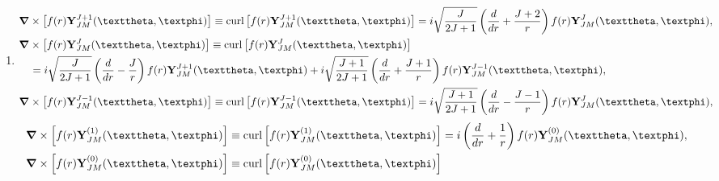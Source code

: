 \begin{enumerate}[label=(\alph*)]
\begin{align}
\end{align}
\begin{align}
\boldsymbol{\nabla} \cdot\left[f(r) \vect{Y}_{J M}^{(1)}(\vartheta, \varphi)\right] &\equiv \diver \left[f(r) \vect{Y}_{J M}^{(1)}(\vartheta, \varphi)\right]=-\sqrt{J(J+1)} \frac{1}{r} f(r) Y_{J M}(\vartheta, \varphi), \notag\\
\boldsymbol{\nabla} \cdot\left[f(r) \vect{Y}_{J M}^{(0)}(\vartheta, \varphi)\right] &\equiv \diver \left[f(r) \vect{Y}_{J M}^{(0)}(\vartheta, \varphi)\right]=0, \label{eq:7:3:54}\\
\boldsymbol{\nabla} \cdot\left[f(r) \vect{Y}_{J M}^{(-1)}(\vartheta, \varphi)\right] &\equiv \diver \left[f(r) \vect{Y}_{J M}^{(-1)}(\vartheta, \varphi)\right]=\left(\frac{d}{d r}+\frac{2}{r}\right) f(r) Y_{J M}(\vartheta, \varphi). \notag
\end{align}
\item 
\begin{align}
& \boldsymbol{\nabla} \times\left[f(r) \vect{Y}_{J M}^{J+1}(\vartheta, \varphi)\right] \equiv \curl \left[f(r) \vect{Y}_{J M}^{J+1}(\vartheta, \varphi)\right]=i \sqrt{\frac{J}{2 J+1}}\left(\frac{d}{d r}+\frac{J+2}{r}\right) f(r) \vect{Y}_{J M}^{J}(\vartheta, \varphi), \notag\\
& \boldsymbol{\nabla} \times\left[f(r) \vect{Y}_{J M}^{J}(\vartheta, \varphi)\right] \equiv \curl \left[f(r) \vect{Y}_{J M}^{J}(\vartheta, \varphi)\right] \notag\\
& \quad=i \sqrt{\frac{J}{2 J+1}}\left(\frac{d}{d r}-\frac{J}{r}\right) f(r) \vect{Y}_{J M}^{J+1}(\vartheta, \varphi)+i \sqrt{\frac{J+1}{2 J+1}}\left(\frac{d}{d r}+\frac{J+1}{r}\right) f(r) \vect{Y}_{J M}^{J-1}(\vartheta, \varphi), \label{eq:7:3:55}\\
& \boldsymbol{\nabla} \times\left[f(r) \vect{Y}_{J M}^{J-1}(\vartheta, \varphi)\right] \equiv \curl \left[f(r) \vect{Y}_{J M}^{J-1}(\vartheta, \varphi)\right]=i \sqrt{\frac{J+1}{2 J+1}}\left(\frac{d}{d r}-\frac{J-1}{r}\right) f(r) \vect{Y}_{J M}^{J}(\vartheta, \varphi), \notag
\end{align}
\begin{align}
 \boldsymbol{\nabla} \times\left[f(r) \vect{Y}_{J M}^{(1)}(\vartheta, \varphi)\right]&\equiv \curl \left[f(r) \vect{Y}_{J M}^{(1)}(\vartheta, \varphi)\right]=i\left(\frac{d}{d r}+\frac{1}{r}\right) f(r) \vect{Y}_{J M}^{(0)}(\vartheta, \varphi), \notag\\
 \boldsymbol{\nabla} \times\left[f(r) \vect{Y}_{J M}^{(0)}(\vartheta, \varphi)\right] &\equiv \curl \left[f(r) \vect{Y}_{J M}^{(0)}(\vartheta, \varphi)\right] \notag\\

\end{align}
\end{enumerate}
